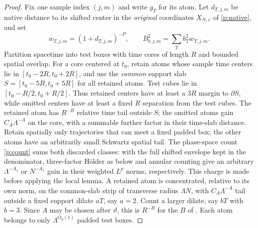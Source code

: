 \begin{proof}
Fix one sample index $(j,m)$ and write $g_T$ for its atom.  Let
$d_{T,j,m}$ be native distance to its shifted center in the
\emph{original} coordinates $X_{N,v}$ of \eqref{p:native}, and set
\[
 w_{T,j,m}=(1+d_{T,j,m})^{-P},\qquad
 B_{b,j,m}^2=\sum_Tb_T^2w_{T,j,m}.
\]
Partition spacetime into test boxes with time cores of length $R$ and
bounded spatial overlap.  For a core centered at $t_0$, retain atoms whose sample
time centers lie in $[t_0-2R,t_0+2R]$, and use the \emph{common} support
slab $S=[t_0-5R,t_0+5R]$ for all retained atoms.  Test cubes lie in
$[t_0-R/2,t_0+R/2]$.  Thus retained centers have at least a $3R$
margin to $\partial S$, while omitted centers have at least a fixed
$R$ separation from the test cubes.  The retained atom has
$R^{-B}$ relative time tail outside $S$; the omitted atoms gain
$C_A\Lambda^{-A}$ on the core, with a summable further factor in their
time-slab distance.  Retain spatially only trajectories that can meet a
fixed padded box; the other atoms have an arbitrarily small Schwartz
spatial tail.  The phase-space count \eqref{p:count} sums both discarded
classes: with the full shifted envelope kept in the denominator,
three-factor H\"older as below and annular counting give an arbitrary
$\Lambda^{-A_1}$ or $N^{-A_1}$ gain in their weighted $L^p$ norms,
respectively.  This charge is made before applying the local lemma.
A retained atom is concentrated, relative to its own norm,
on the common-slab strip of transverse radius $\Lambda N$, with
$C_A\Lambda^{-A}$ tail outside a fixed support dilate $aT$, say $a=2$.
Count a larger dilate, say $bT$ with $b=3$.  Since $A$ may be chosen after
$\vartheta$, this is $R^{-B}$ for the $B$ of
.  Each atom belongs to only
$\Lambda^{O_d(1)}$ padded test boxes.


\end{proof}
